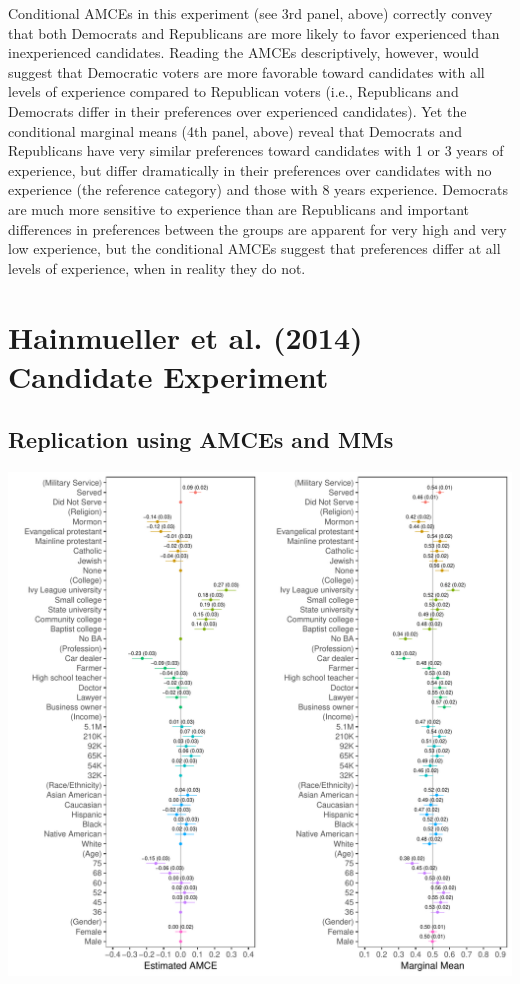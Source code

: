 \documentclass[a4paper,12pt]{article}\usepackage[]{graphicx}\usepackage[]{color}
\makeatletter
\def\maxwidth{ %
  \ifdim\Gin@nat@width>\linewidth
    \linewidth
  \else
    \Gin@nat@width
  \fi
}
\newenvironment{knitrout}{}{} %
\makeatother
\begin{document}
\noindent Conditional AMCEs in this experiment (see 3rd panel, above) correctly convey that both Democrats and Republicans are more likely to favor experienced than inexperienced candidates. Reading the AMCEs descriptively, however, would suggest that Democratic voters are more favorable toward candidates with all levels of experience compared to Republican voters (i.e., Republicans and Democrats differ in their preferences over experienced candidates). Yet the conditional marginal means (4th panel, above) reveal that Democrats and Republicans have very similar preferences toward candidates with 1 or 3 years of experience, but differ dramatically in their preferences over candidates with no experience (the reference category) and those with 8 years experience. Democrats are much more sensitive to experience than are Republicans and important differences in preferences between the groups are apparent for very high and very low experience, but the conditional AMCEs suggest that preferences differ at all levels of experience, when in reality they do not.

\clearpage 

\section{Hainmueller et al. (2014) Candidate Experiment}\label{app:hainmuellercandidate}

\subsection{Replication using AMCEs and MMs}

\begin{knitrout}
\color{fgcolor}
\includegraphics[width=\maxwidth]{figure/hainmueller_candidate_amce_appendix-1} 

\end{knitrout}
\end{document}
